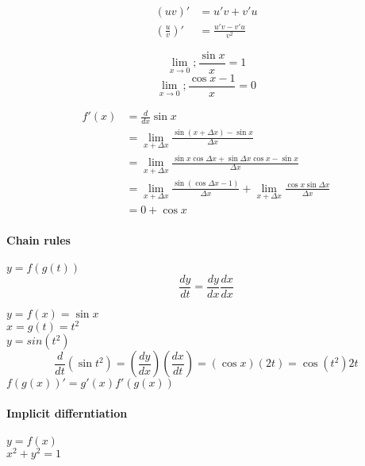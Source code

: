\documentclass{article}
\begin{document}
                        \begin{align*}
                            (uv)' &= u'v + v'u\\
                            (\frac{u}{v})' &= \frac{u'v - v'u}{v^2}
                        \end{align*}


                        \[ \lim_{x \to 0}; \frac{\sin x}{x} = 1\]
                        \[    \lim_{x \to 0}; \frac{\cos x -1}{x} = 0\]

                        \begin{align*}
                            f'(x) &= \frac{d}{dx} \sin x\\
                            &= \lim_{x+\Delta x} \frac{\sin(x+\Delta x) - \sin x}{\Delta x}\\
                            &= \lim_{x+\Delta x} \frac{\sin x \cos \Delta x + \sin \Delta x \cos x - \sin x}{\Delta x}\\
                            &= \lim_{x+\Delta x} \frac{\sin(\cos \Delta x -1)}{\Delta x} + \lim_{x+\Delta x} \frac{\cos x \sin \Delta x}{\Delta x}\\
                            &= 0 + \cos x
                        \end{align*}

                    \paragraph{Chain rules}
                        $ y= f(g(t))$\\
                        \[ \frac{dy}{dt} = \frac{dy}{dx}\frac{dx}{dx} \]

                        $y = f(x) = \sin x$\\
                        $x = g(t) = t^2$\\
                        $y = sin(t^2)$\\
                        \[ \frac{d}{dt}(\sin t^2) = (\frac{dy}{dx})(\frac{dx}{dt})=(\cos x)(2t) = \cos(t^2)2t \]
                        $f(g(x))' = g'(x)f'(g(x))$

                    \paragraph{Implicit differntiation}

                    $y = f(x) $\\
                    $x^2 + y^2 = 1 $\\
\end{document}
